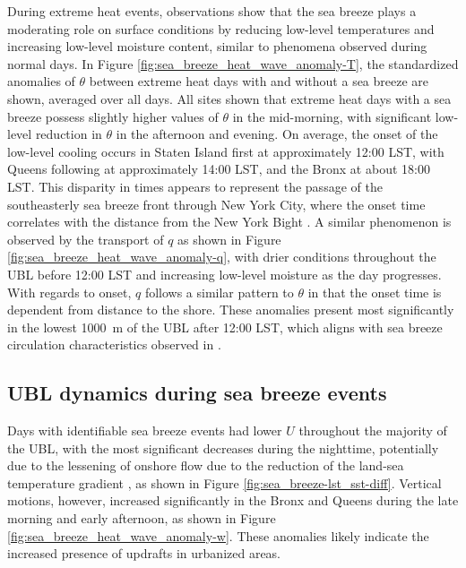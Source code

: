 \documentclass[11pt,a4paper]{article}
\begin{document}
During extreme heat events, observations show that the sea breeze plays a moderating role on surface conditions by reducing low-level temperatures and increasing low-level moisture content, similar to phenomena observed during normal days. In Figure \ref{fig:sea_breeze_heat_wave_anomaly-T}, the standardized anomalies of $\theta$ between extreme heat days with and without a sea breeze are shown, averaged over all days. All sites shown that extreme heat days with a sea breeze possess slightly higher values of $\theta$ in the mid-morning, with significant low-level reduction in $\theta$ in the afternoon and evening. On average, the onset of the low-level cooling occurs in Staten Island first at approximately 12:00 LST, with Queens following at approximately 14:00 LST, and the Bronx at about 18:00 LST. This disparity in times appears to represent the passage of the southeasterly sea breeze front through New York City, where the onset time correlates with the distance from the New York Bight \citep{bornstein1981}. A similar phenomenon is observed by the transport of $q$ as shown in Figure \ref{fig:sea_breeze_heat_wave_anomaly-q}, with drier conditions throughout the UBL before 12:00 LST and increasing low-level moisture as the day progresses. With regards to onset, $q$ follows a similar pattern to $\theta$ in that the onset time is dependent from distance to the shore. These anomalies present most significantly in the lowest \SI{1000}{\meter} of the UBL after 12:00 LST, which aligns with sea breeze circulation characteristics observed in \citet{frizzola1963}.

\subsection{UBL dynamics during sea breeze events}
Days with identifiable sea breeze events had lower $U$ throughout the majority of the UBL, with the most significant decreases during the nighttime, potentially due to the lessening of onshore flow due to the reduction of the land-sea temperature gradient \citep{pullen2007}, as shown in Figure \ref{fig:sea_breeze-lst_sst-diff}. Vertical motions, however, increased significantly in the Bronx and Queens during the late morning and early afternoon, as shown in Figure \ref{fig:sea_breeze_heat_wave_anomaly-w}. These anomalies likely indicate the increased presence of updrafts in urbanized areas.
\end{document}
